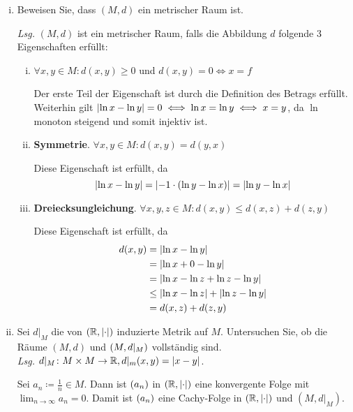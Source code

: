 \documentclass{article}
\begin{document}
\begin{enumerate}[(i)]
\item Beweisen Sie, dass $(M, d)$ ein metrischer Raum ist.

  \textit{Lsg.} $(M, d)$ ist ein metrischer Raum, falls die Abbildung $d$ folgende 3 Eigenschaften
  erfüllt:
  \begin{enumerate}[(i)]
  \item $\forall x, y \in M \colon d(x, y) \geq 0$ und $d(x, y) = 0 \iff x = f$

    Der erste Teil der Eigenschaft ist durch die Definition des Betrags erfüllt.
    Weiterhin  gilt $\abs{\ln x - \ln y} = 0 \iff \ln x = \ln y \iff x = y$,
    da $\ln$ monoton steigend und somit injektiv ist.

  \item \textbf{Symmetrie}. $\forall x, y \in M \colon d(x, y) = d(y, x)$

    Diese Eigenschaft ist erfüllt, da
    \[
      \abs{\ln x - \ln y} = \abs{-1 \cdot (\ln y - \ln x)} = \abs{\ln y - \ln x}
    \]

  \item \textbf{Dreiecksungleichung}. $\forall x, y, z \in M \colon d(x, y) \leq d(x, z) + d(z, y)$

    Diese Eigenschaft ist erfüllt, da
    \begin{align*}
      d(x, y) &= \abs{\ln x - \ln y} \\
              &= \abs{\ln x + 0 - \ln y} \\
              &= \abs{\ln x - \ln z + \ln z -  \ln y} \\
              &\leq \abs{\ln x - \ln z} + \abs{\ln z - \ln y} \\
              &= d(x, z) + d(z, y)
    \end{align*}
  \end{enumerate}

\newpage
\item Sei $d|_M$ die von $(\mathbb{R}, \abs{\cdot})$ induzierte Metrik auf $M$.
  Untersuchen Sie, ob die Räume $(M, d)$ und $\qty(M, d|_M)$ vollständig sind. \\

  \textit{Lsg.} $d|_M \colon M \times M \to \mathbb{R}, d|_m(x, y) = \abs{x - y}$.

  Sei $a_n \coloneqq \frac{1}{n} \in M$.
  Dann ist $\qty(a_n)$ in $(\mathbb{R}, \abs{\cdot})$ eine konvergente Folge mit
  $\lim_{n \to \infty} a_n = 0$.
  Damit ist $\qty(a_n)$ eine Cachy-Folge in $(\mathbb{R}, \abs{\cdot})$ und $(M, d|_M)$.


\end{enumerate}
\end{document}
